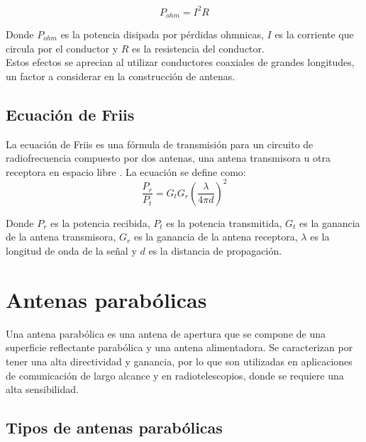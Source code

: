 \begin{equation}
    P_{ohm} = I^{2}R
\end{equation}

Donde $P_{ohm}$ es la potencia disipada por pérdidas ohmnicas, $I$ es la corriente que circula por el conductor y $R$ es la resistencia del conductor.\\

Estos efectos se aprecian al utilizar conductores coaxiales de grandes longitudes, un factor a considerar en la construcción de antenas.\\

\subsection{Ecuación de Friis}

La ecuación de Friis es una fórmula de transmisión para un circuito de radiofrecuencia compuesto por dos antenas, una antena transmisora u otra receptora en espacio libre \cite{Friis1946}. La ecuación se define como:\\

\begin{equation}
    \frac{P_{r}}{P_{t}} = G_{t}G_{r}\left(\frac{\lambda}{4\pi d}\right)^{2}
\end{equation}

Donde $P_{r}$ es la potencia recibida, $P_{t}$ es la potencia transmitida, $G_{t}$ es la ganancia de la antena transmisora, $G_{r}$ es la ganancia de la antena receptora, $\lambda$ es la longitud de onda de la señal y $d$ es la distancia de propagación.\\

\section{Antenas parabólicas}

Una antena parabólica es una antena de apertura que se compone de una superficie reflectante parabólica y una antena alimentadora. Se caracterizan por tener una alta directividad y ganancia, por lo que son utilizadas en aplicaciones de comunicación de largo alcance y en radiotelescopios, donde se requiere una alta sensibilidad.\\


\subsection{Tipos de antenas parabólicas}

